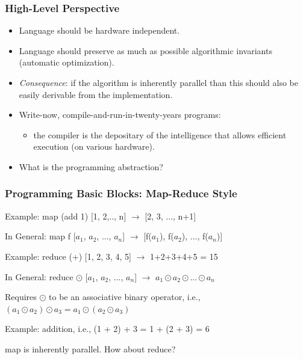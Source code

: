 \documentclass{beamer}
\newcommand{\emp}[1]{\textcolor{DikuRed}{ #1}}
\begin{document}
\begin{frame}
  \frametitle{High-Level Perspective} %
  \centering

\begin{itemize}

\item \emp{Language} should be hardware independent. \bigskip

\item \emp{Language} should preserve as much as possible algorithmic invariants (automatic optimization). \bigskip

\item {\em Consequence}: if the algorithm is inherently parallel than this should 
                        also be easily derivable from the implementation. \bigskip

\item Write-now, compile-and-run-in-twenty-years programs: 
    \begin{itemize} 
        \item the compiler is the depositary of the intelligence that 
                allows efficient execution (on various hardware).
    \end{itemize} \bigskip

\item What is the programming abstraction? \bigskip

\end{itemize} 

\end{frame}

\begin{frame}
  \frametitle{Programming Basic Blocks: Map-Reduce Style} %


Example: \alert{map} (add 1) [1, 2,.., n]  $\rightarrow$ [2, 3, ..., n+1] \smallskip

In General: \alert{map} f [$a_1$, $a_2$, ..., $a_n$] $\rightarrow$ [f($a_1$), f($a_2$), ..., f($a_n$)] \bigskip



Example: \alert{reduce} (+) [1, 2, 3, 4, 5] $\rightarrow$ 1+2+3+4+5 = 15 \smallskip

In General: \alert{reduce} $\odot$ [$a_1$, $a_2$, ..., $a_n$] $\rightarrow$ $a_1 \odot a_2 \odot ... \odot a_n$ \bigskip



Requires $\odot$ to be an associative binary operator, i.e., $(a_1 \odot a_2) \odot a_3 = a_1 \odot (a_2 \odot a_3)$ \\ \smallskip

Example: addition, i.e., (1 + 2) + 3 = 1 + (2 + 3) = 6  \bigskip


\alert{map} is inherently parallel. How about \alert{reduce}?


\end{frame}
\end{document}
